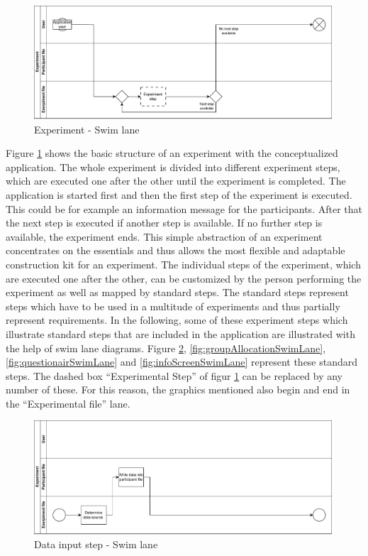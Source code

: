 \begin{figure}[htbp]
    \centering
    \includegraphics[width=0.99\textwidth, keepaspectratio]{content/05_design_and_dev_artefacts/ExperimentSwimLane.drawio.pdf}
    \caption{Experiment - Swim lane}    
    \label{fig:experimentSwimLane}
\end{figure}

Figure \ref{fig:experimentSwimLane} shows the basic structure of an experiment with the conceptualized application. The whole experiment is divided into different experiment steps, which are executed one after the other until the experiment is completed. The application is started first and then the first step of the experiment is executed. This could be for example an information message for the participants. After that the next step is executed if another step is available. If no further step is available, the experiment ends. This simple abstraction of an experiment concentrates on the essentials and thus allows the most flexible and adaptable construction kit for an experiment. The individual steps of the experiment, which are executed one after the other, can be customized by the person performing the experiment as well as mapped by standard steps. The standard steps represent steps which have to be used in a multitude of experiments and thus partially represent requirements. In the following, some of these experiment steps which illustrate standard steps that are included in the application are illustrated with the help of swim lane diagrams. Figure \ref{fig:DataInputSwimLane}, \ref{fig:groupAllocationSwimLane}, \ref{fig:questionairSwimLane} and \ref{fig:infoScreenSwimLane} represent these standard steps. The dashed box \enquote{Experimental Step} of figur \ref{fig:experimentSwimLane} can be replaced by any number of these. For this reason, the graphics mentioned also begin and end in the \enquote{Experimental file} lane.

\begin{figure}[htbp]
    \centering
    \includegraphics[width=0.99\textwidth, keepaspectratio]{content/05_design_and_dev_artefacts/DataInputSwimLane.drawio.pdf}
    \caption{Data input step - Swim lane}    
    \label{fig:DataInputSwimLane}
\end{figure}

